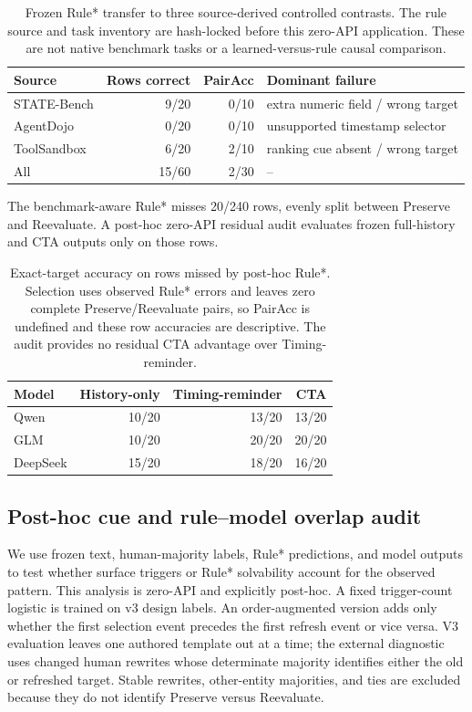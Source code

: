 \documentclass[10pt]{article}
\begin{document}
\begin{table}[H]
\centering
\small
\begin{tabular}{lrrl}
\toprule
Source & Rows correct & PairAcc & Dominant failure \\
\midrule
STATE-Bench & 9/20 & 0/10 & extra numeric field / wrong target \\
AgentDojo & 0/20 & 0/10 & unsupported timestamp selector \\
ToolSandbox & 6/20 & 2/10 & ranking cue absent / wrong target \\
\midrule
All & 15/60 & 2/30 & -- \\
\bottomrule
\end{tabular}
\caption{Frozen Rule* transfer to three source-derived controlled contrasts. The rule source and
task inventory are hash-locked before this zero-API application. These are not native benchmark
tasks or a learned-versus-rule causal comparison.}
\label{tab:supp-rule-source}
\end{table}

The benchmark-aware Rule* misses 20/240 \NewSchemaReplication{} rows, evenly split between
Preserve and Reevaluate. A post-hoc zero-API residual audit evaluates frozen full-history and CTA
outputs only on those rows.

\begin{table}[H]
\centering
\small
\begin{tabular}{lrrr}
\toprule
Model & History-only & Timing-reminder & CTA \\
\midrule
Qwen & 10/20 & 13/20 & 13/20 \\
GLM & 10/20 & 20/20 & 20/20 \\
DeepSeek & 15/20 & 18/20 & 16/20 \\
\bottomrule
\end{tabular}
\caption{Exact-target accuracy on rows missed by post-hoc Rule*. Selection uses observed Rule*
errors and leaves zero complete Preserve/Reevaluate pairs, so PairAcc is undefined and these row
accuracies are descriptive. The audit provides no residual CTA advantage over Timing-reminder.}
\label{tab:supp-rule-hard-residual}
\end{table}

\subsection{Post-hoc cue and rule--model overlap audit}
We use frozen text, human-majority labels, Rule* predictions, and model outputs to test whether
surface triggers or Rule* solvability account for the observed pattern. This analysis is zero-API
and explicitly post-hoc. A fixed trigger-count logistic is trained on v3 design labels. An
order-augmented version adds only whether the first selection event precedes the first refresh
event or vice versa. V3 evaluation leaves one authored template out at a time; the external
diagnostic uses changed human rewrites whose determinate majority identifies either the old or
refreshed target. Stable rewrites, other-entity majorities, and ties are excluded because they do
not identify Preserve versus Reevaluate.
\end{document}
